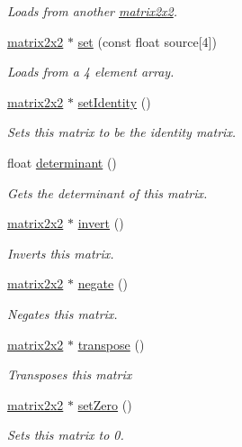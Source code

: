 \begin{DoxyCompactItemize}
\begin{DoxyCompactList}\small\item\em Loads from another \hyperlink{classflounder_1_1matrix2x2}{matrix2x2}. \end{DoxyCompactList}\item 
\hyperlink{classflounder_1_1matrix2x2}{matrix2x2} $\ast$ \hyperlink{classflounder_1_1matrix2x2_a9691dba556d6700ba3ed38522fd70820}{set} (const float source\mbox{[}4\mbox{]})
\begin{DoxyCompactList}\small\item\em Loads from a 4 element array. \end{DoxyCompactList}\item 
\hyperlink{classflounder_1_1matrix2x2}{matrix2x2} $\ast$ \hyperlink{classflounder_1_1matrix2x2_ab2faeb82835ac1637fbf27f78df70443}{set\+Identity} ()
\begin{DoxyCompactList}\small\item\em Sets this matrix to be the identity matrix. \end{DoxyCompactList}\item 
float \hyperlink{classflounder_1_1matrix2x2_aba728cb860075c19d7776b460d20bff7}{determinant} ()
\begin{DoxyCompactList}\small\item\em Gets the determinant of this matrix. \end{DoxyCompactList}\item 
\hyperlink{classflounder_1_1matrix2x2}{matrix2x2} $\ast$ \hyperlink{classflounder_1_1matrix2x2_a88dc423971ee40b21df08f8ae5b03d43}{invert} ()
\begin{DoxyCompactList}\small\item\em Inverts this matrix. \end{DoxyCompactList}\item 
\hyperlink{classflounder_1_1matrix2x2}{matrix2x2} $\ast$ \hyperlink{classflounder_1_1matrix2x2_a51f536a3ed089adb0b6b6b8bb757bf95}{negate} ()
\begin{DoxyCompactList}\small\item\em Negates this matrix. \end{DoxyCompactList}\item 
\hyperlink{classflounder_1_1matrix2x2}{matrix2x2} $\ast$ \hyperlink{classflounder_1_1matrix2x2_ab2c07c15e39a1ab13270d88d7d83ee47}{transpose} ()
\begin{DoxyCompactList}\small\item\em Transposes this matrix \end{DoxyCompactList}\item 
\hyperlink{classflounder_1_1matrix2x2}{matrix2x2} $\ast$ \hyperlink{classflounder_1_1matrix2x2_aca923ffc8b695dc00d974860691e89d9}{set\+Zero} ()
\begin{DoxyCompactList}\small\item\em Sets this matrix to 0. \end{DoxyCompactList}\end{DoxyCompactItemize}
